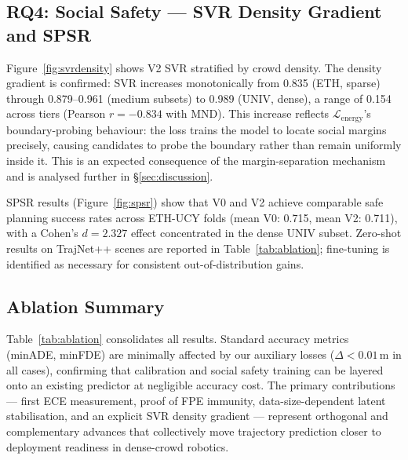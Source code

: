 \subsection{RQ4: Social Safety --- SVR Density Gradient and SPSR}
\label{sec:results:rq4}

Figure~\ref{fig:svrdensity} shows V2 SVR stratified by crowd density.
The density gradient is confirmed: SVR increases monotonically from 0.835
(ETH, sparse) through 0.879--0.961 (medium subsets) to 0.989 (UNIV, dense),
a range of 0.154 across tiers (Pearson \(r = -0.834\) with MND).
This increase reflects \(\mathcal{L}_{\text{energy}}\)'s boundary-probing
behaviour: the loss trains the model to locate social margins precisely,
causing candidates to probe the boundary rather than remain uniformly inside
it. This is an expected consequence of the margin-separation mechanism and
is analysed further in \S\ref{sec:discussion}.

SPSR results (Figure~\ref{fig:spsr}) show that V0 and V2 achieve comparable
safe planning success rates across ETH-UCY folds (mean V0: 0.715, mean V2:
0.711), with a Cohen's \(d = 2.327\) effect concentrated in the dense UNIV
subset. Zero-shot results on TrajNet++ scenes are reported in
Table~\ref{tab:ablation}; fine-tuning is identified as necessary for
consistent out-of-distribution gains.

\subsection{Ablation Summary}
\label{sec:results:ablation}

Table~\ref{tab:ablation} consolidates all results. Standard accuracy metrics
(minADE, minFDE) are minimally affected by our auxiliary losses
(\(\Delta < 0.01\)\,m in all cases), confirming that calibration and social
safety training can be layered onto an existing predictor at negligible
accuracy cost. The primary contributions --- first ECE measurement,
proof of FPE immunity, data-size-dependent latent stabilisation, and an
explicit SVR density gradient --- represent orthogonal and complementary
advances that collectively move trajectory prediction closer to deployment
readiness in dense-crowd robotics.
